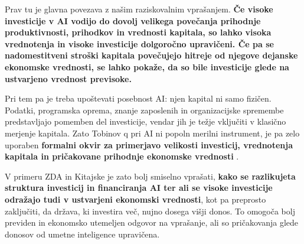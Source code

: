 \documentclass[12pt,a4paper]{article}
\begin{document}
Prav tu je glavna povezava z našim raziskovalnim vprašanjem. \textbf{Če visoke investicije v AI vodijo do dovolj velikega povečanja prihodnje produktivnosti, prihodkov in vrednosti kapitala, so lahko visoka vrednotenja in visoke investicije dolgoročno upravičeni. Če pa se nadomestitveni stroški kapitala povečujejo hitreje od njegove dejanske ekonomske vrednosti, se lahko pokaže, da so bile investicije glede na ustvarjeno vrednost previsoke.}

Pri tem pa je treba upoštevati posebnost AI: njen kapital ni samo fizičen. Podatki, programska oprema, znanje zaposlenih in organizacijske spremembe predstavljajo pomemben del investicije, vendar jih je težje vključiti v klasično merjenje kapitala. Zato Tobinov q pri AI ni popoln merilni instrument, je pa zelo uporaben \textbf{formalni okvir za primerjavo velikosti investicij, vrednotenja kapitala in pričakovane prihodnje ekonomske vrednosti} \citep{PetersTaylor2016}.

V primeru ZDA in Kitajske je zato bolj smiselno vprašati, \textbf{kako se razlikujeta struktura investicij in financiranja AI ter ali se visoke investicije odražajo tudi v ustvarjeni ekonomski vrednosti}, kot pa preprosto zaključiti, da država, ki investira več, nujno dosega višji donos. To omogoča bolj previden in ekonomsko utemeljen odgovor na vprašanje, ali so pričakovanja glede donosov od umetne inteligence upravičena.
\end{document}
